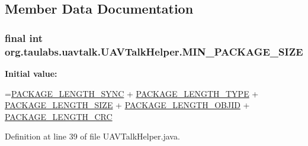 \subsection{Member Data Documentation}
\hypertarget{classorg_1_1taulabs_1_1uavtalk_1_1_u_a_v_talk_helper_acca7dfc119249e6cd79ce3f4f2a0c980}{
\subsubsection[{M\-I\-N\-\_\-\-P\-A\-C\-K\-A\-G\-E\-\_\-\-S\-I\-Z\-E}]{\setlength{\rightskip}{0pt plus 5cm}final {\bf int} org.\-taulabs.\-uavtalk.\-U\-A\-V\-Talk\-Helper.\-M\-I\-N\-\_\-\-P\-A\-C\-K\-A\-G\-E\-\_\-\-S\-I\-Z\-E\hspace{0.3cm}{\ttfamily [static]}}}\label{classorg_1_1taulabs_1_1uavtalk_1_1_u_a_v_talk_helper_acca7dfc119249e6cd79ce3f4f2a0c980}
{\bfseries Initial value\-:}
\begin{DoxyCode}
=\hyperlink{classorg_1_1taulabs_1_1uavtalk_1_1_u_a_v_talk_helper_ab11d89e3277ccd5635a8680386201385}{PACKAGE\_LENGTH\_SYNC} 
                                                                                    + 
      \hyperlink{classorg_1_1taulabs_1_1uavtalk_1_1_u_a_v_talk_helper_a2f030393c6a563452702a5d1c0cc06fd}{PACKAGE\_LENGTH\_TYPE} 
                                                                                    + 
      \hyperlink{classorg_1_1taulabs_1_1uavtalk_1_1_u_a_v_talk_helper_a3429fe1986e7f1fcafdb366cb2cff77b}{PACKAGE\_LENGTH\_SIZE} 
                                                                                    + 
      \hyperlink{classorg_1_1taulabs_1_1uavtalk_1_1_u_a_v_talk_helper_a1c9fe1427e747df427714555bef558f4}{PACKAGE\_LENGTH\_OBJID}
                                                                                    + 
      \hyperlink{classorg_1_1taulabs_1_1uavtalk_1_1_u_a_v_talk_helper_ad84005b472609cb580ad2741721d4b72}{PACKAGE\_LENGTH\_CRC}
\end{DoxyCode}


Definition at line 39 of file U\-A\-V\-Talk\-Helper.\-java.

